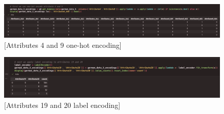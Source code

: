 \documentclass{article}
\begin{document}
    \begin{figure}[H]
        \centering
        \includegraphics[width=\textwidth, height=0.13\textheight]{./I_1_g_a.png}
        \caption{[Attributes 4 and 9 one-hot encoding]}
    \end{figure}
    \begin{figure}[H]
        \centering
        \includegraphics[width=\textwidth, height=0.13\textheight]{./I_1_g_b.png}
        \caption{[Attributes 19 and 20 label encoding]}
    \end{figure}
\end{document}
